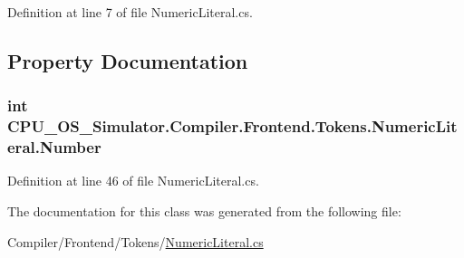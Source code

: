 Definition at line 7 of file Numeric\+Literal.\+cs.



\subsection{Property Documentation}
\hypertarget{class_c_p_u___o_s___simulator_1_1_compiler_1_1_frontend_1_1_tokens_1_1_numeric_literal_a5bc7315e1e1e428d850c005ad06344e3}{}
\subsubsection[{Number}]{\setlength{\rightskip}{0pt plus 5cm}int C\+P\+U\+\_\+\+O\+S\+\_\+\+Simulator.\+Compiler.\+Frontend.\+Tokens.\+Numeric\+Literal.\+Number\hspace{0.3cm}{\ttfamily [get]}}\label{class_c_p_u___o_s___simulator_1_1_compiler_1_1_frontend_1_1_tokens_1_1_numeric_literal_a5bc7315e1e1e428d850c005ad06344e3}


Definition at line 46 of file Numeric\+Literal.\+cs.



The documentation for this class was generated from the following file\+:\begin{DoxyCompactItemize}
\item 
Compiler/\+Frontend/\+Tokens/\hyperlink{_numeric_literal_8cs}{Numeric\+Literal.\+cs}\end{DoxyCompactItemize}
